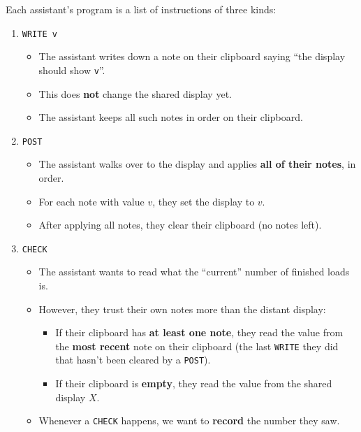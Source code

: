 Each assistant's program is a list of instructions of three kinds:
\begin{enumerate}[label=\arabic*., leftmargin=*]
    \item \texttt{WRITE v}
    \begin{itemize}
        \item The assistant writes down a note on their clipboard saying ``the
        display should show \texttt{v}''.
        \item This does \textbf{not} change the shared display yet.
        \item The assistant keeps all such notes in order on their clipboard.
    \end{itemize}

    \item \texttt{POST}
    \begin{itemize}
        \item The assistant walks over to the display and applies \textbf{all of
        their notes}, in order.
        \item For each note with value \(v\), they set the display to \(v\).
        \item After applying all notes, they clear their clipboard (no notes
        left).
    \end{itemize}

    \item \texttt{CHECK}
    \begin{itemize}
        \item The assistant wants to read what the ``current'' number of
        finished loads is.
        \item However, they trust their own notes more than the distant display:
        \begin{itemize}
            \item If their clipboard has \textbf{at least one note}, they read
            the value from the \textbf{most recent} note on their clipboard (the
            last \texttt{WRITE} they did that hasn't been cleared by a
            \texttt{POST}).
            \item If their clipboard is \textbf{empty}, they read the value from
            the shared display \(X\).
        \end{itemize}
        \item Whenever a \texttt{CHECK} happens, we want to \textbf{record} the
        number they saw.
    \end{itemize}
\end{enumerate}

